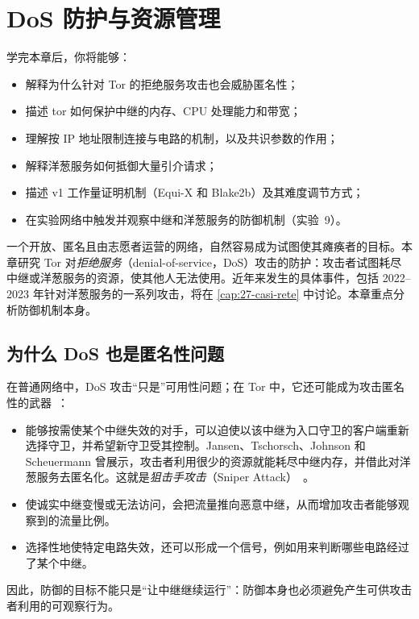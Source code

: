 \chapter{DoS 防护与资源管理}\label{cap:15-dos}

\begin{obiettivi}
学完本章后，你将能够：
\begin{itemize}[nosep]
  \item 解释为什么针对 Tor 的拒绝服务攻击也会威胁匿名性；
  \item 描述 tor 如何保护中继的内存、CPU 处理能力和带宽；
  \item 理解按 IP 地址限制连接与电路的机制，以及共识参数的作用；
  \item 解释洋葱服务如何抵御大量引介请求；
  \item 描述 v1 工作量证明机制（Equi-X 和 Blake2b）及其难度调节方式；
  \item 在实验网络中触发并观察中继和洋葱服务的防御机制（实验~9）。
\end{itemize}
\end{obiettivi}

一个开放、匿名且由志愿者运营的网络，自然容易成为试图使其瘫痪者的目标。本章研究 Tor 对\emph{拒绝服务}（denial-of-service，DoS）攻击的防护：攻击者试图耗尽中继或洋葱服务的资源，使其他人无法使用。近年来发生的具体事件，包括 2022--2023 年针对洋葱服务的一系列攻击，将在 \cref{cap:27-casi-rete} 中讨论。本章重点分析防御机制本身。

\section{为什么 DoS 也是匿名性问题}\label{sec:dos-anonimato}

在普通网络中，DoS 攻击\enquote{只是}可用性问题；在 Tor 中，它还可能成为攻击匿名性的武器~：
\begin{itemize}
  \item 能够按需使某个中继失效的对手，可以迫使以该中继为入口守卫的客户端重新选择守卫，并希望新守卫受其控制。Jansen、Tschorsch、Johnson 和 Scheuermann 曾展示，攻击者利用很少的资源就能耗尽中继内存，并借此对洋葱服务去匿名化。这就是\emph{狙击手攻击}（Sniper Attack）~\cite{jansen2014sniper}。
  \item 使诚实中继变慢或无法访问，会把流量推向恶意中继，从而增加攻击者能够观察到的流量比例。
  \item 选择性地使特定电路失效，还可以形成一个信号，例如用来判断哪些电路经过了某个中继。
\end{itemize}
因此，防御的目标不能只是\enquote{让中继继续运行}：防御本身也必须避免产生可供攻击者利用的可观察行为。

